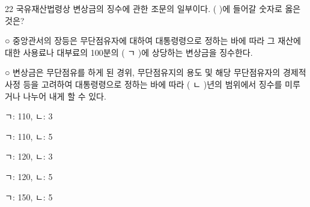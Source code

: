 \begin{question}{22}
국유재산법령상 변상금의 징수에 관한 조문의 일부이다. ( )에 들어갈 숫자로 옳은 것은?
\begin{framedtext}
○ 중앙관서의 장등은 무단점유자에 대하여 대통령령으로 정하는 바에 따라 그 재산에 대한 사용료나 대부료의 100분의 ( ㄱ )에 상당하는 변상금을 징수한다. \par
○ 변상금은 무단점유를 하게 된 경위, 무단점유지의 용도 및 해당 무단점유자의 경제적 사정 등을 고려하여 대통령령으로 정하는 바에 따라 ( ㄴ )년의 범위에서 징수를 미루거나 나누어 내게 할 수 있다. \par
\end{framedtext}
\begin{choices}
  \item ㄱ: 110, ㄴ: 3
  \item ㄱ: 110, ㄴ: 5
  \item ㄱ: 120, ㄴ: 3
  \item ㄱ: 120, ㄴ: 5
  \item ㄱ: 150, ㄴ: 5
\end{choices}
\end{question}
